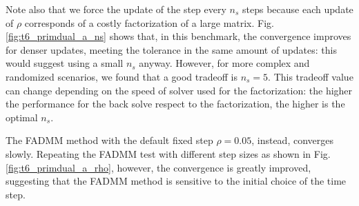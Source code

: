 \documentclass[AMA,STIX1COL]{WileyNJD-v2}
\begin{document}
Note also that we force the update of the step every $n_s$ steps because each update of $\rho$ corresponds of a costly factorization of a large matrix.
Fig.\ref{fig:t6_primdual_a_ns} shows that, in this benchmark, the convergence improves for denser updates, 
meeting the tolerance in the same amount of updates: this would suggest using a small $n_s$ anyway. However, for more complex and randomized scenarios, 
we found that a good tradeoff is $n_s=5$. This tradeoff value can change depending on the speed of solver used for the factorization: the higher the performance
for the back solve respect to the factorization, the higher is the optimal $n_s$.

The FADMM method with the default fixed step $\rho=0.05$, instead, converges slowly. 
Repeating the FADMM test with different step sizes as shown in Fig.\ref{fig:t6_primdual_a_rho}, 
however, the convergence is greatly improved, suggesting that the FADMM method is sensitive to the initial choice of the time step. 
\end{document}
